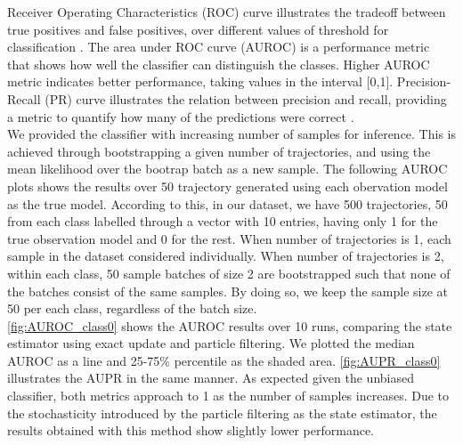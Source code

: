 Receiver Operating Characteristics (ROC) curve illustrates the tradeoff between true positives and false positives, over different values of threshold for classification \cite{Robinson2008}. The area under ROC curve (AUROC) is a performance metric that shows how well the classifier can distinguish the classes. Higher AUROC metric indicates better performance, taking values in the interval [0,1]. Precision-Recall (PR) curve illustrates the relation between precision and recall, providing a metric to quantify how many of the predictions were correct \cite{Boyd2013}.\\
We provided the classifier with increasing number of samples for inference. This is achieved through bootstrapping a given number of trajectories, and using the mean likelihood over the bootrap batch as a new sample. The following AUROC plots shows the results over 50 trajectory generated using each obervation model as the true model. According to this, in our dataset, we have 500 trajectories, 50 from each class labelled through a vector with 10 entries, having only 1 for the true observation model and 0 for the rest. When number of trajectories is 1, each sample in the dataset considered individually. When number of trajectories is 2, within each class, 50 sample batches of size 2 are bootstrapped such that none of the batches consist of the same samples. By doing so, we keep the sample size at 50 per each class, regardless of the batch size. \\
\autoref{fig:AUROC_class0} shows the AUROC results over 10 runs, comparing the state estimator using exact update and particle filtering. We plotted the median AUROC as a line and 25-75\% percentile as the shaded area. \autoref{fig:AUPR_class0} illustrates the AUPR in the same manner. As expected given the unbiased classifier, both metrics approach to 1 as the number of samples increases. Due to the stochasticity introduced by the particle filtering as the state estimator, the results obtained with this method show slightly lower performance. 
